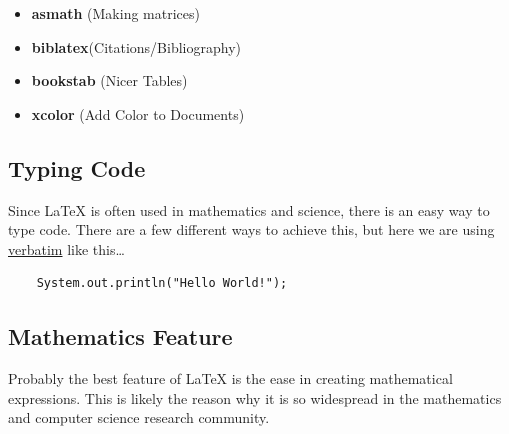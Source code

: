 \begin{itemize}
    \item \textbf{asmath} (Making matrices)
    \item \textbf{biblatex}(Citations/Bibliography)
    \item \textbf{bookstab} (Nicer Tables)
    \item \textbf{xcolor} (Add Color to Documents)
\end{itemize}

\subsection{Typing Code}

Since LaTeX is often used in mathematics and science, there is an easy way to type code. There are a few different ways to achieve this, but here we are using \underline{verbatim} like this\ldots

\begin{verbatim}
    System.out.println("Hello World!");
\end{verbatim}

\subsection{Mathematics Feature}

Probably the best feature of LaTeX is the ease in creating mathematical expressions. This is likely the reason why it is so widespread in the mathematics and computer science research community.

